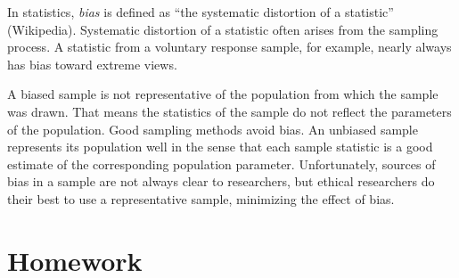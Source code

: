 In statistics, \emph{bias} is defined as ``the systematic distortion of a statistic'' (Wikipedia). Systematic distortion of a statistic often arises from the sampling process. A statistic from a voluntary response sample, for example, nearly always has bias toward extreme views. 

A biased sample is not representative of the population from which the sample was drawn. That means the statistics of the sample do not reflect the parameters of the population. Good sampling methods avoid bias. An unbiased sample represents its population well in the sense that each sample statistic is a good estimate of the corresponding population parameter. Unfortunately, sources of bias in a sample are not always clear to researchers, but ethical researchers do their best to use a representative sample, minimizing the effect of bias. 

\section{Homework}

